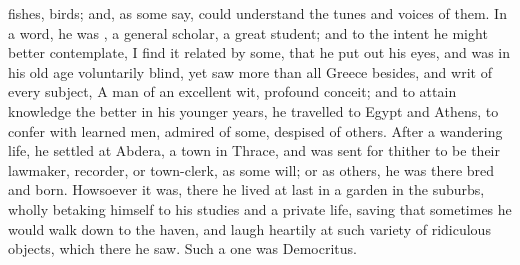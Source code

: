 {fishes, birds; and, as some say, could understand the tunes and
voices of them. In a word, he was , a general scholar,
a great student; and to the intent he might better contemplate, I
find it related by some, that he put out his eyes, and was in his old
age voluntarily blind, yet saw more than all Greece besides, and 
writ of every subject,  A man of an excellent wit, profound conceit; and to
attain knowledge the better in his younger years, he travelled to Egypt
and  Athens, to confer with learned men, admired of some,
despised of others. After a wandering life, he settled at Abdera, a
town in Thrace, and was sent for thither to be their lawmaker,
recorder, or town-clerk, as some will; or as others, he was there bred
and born. Howsoever it was, there he lived at last in a garden in the
suburbs, wholly betaking himself to his studies and a private life,
saving that sometimes he would walk down to the haven, and
laugh heartily at such variety of ridiculous objects, which there he
saw. Such a one was Democritus.

}
